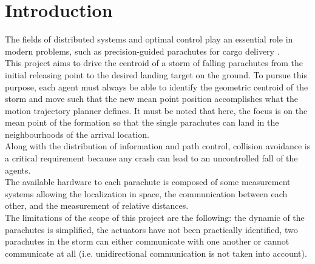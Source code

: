 \section{Introduction}
The fields of distributed systems and optimal control play an essential role in modern problems, such as precision-guided parachutes for cargo delivery \cite{b2} \cite{b3}.\\
This project aims to drive the centroid of a storm of falling parachutes from the initial releasing point to the desired landing target on the ground. To pursue this purpose, each agent must always be able to identify the geometric centroid of the storm and move such that the new mean point position accomplishes what the motion trajectory planner defines. It must be noted that here, the focus is on the mean point of the formation so that the single parachutes can land in the neighbourhoods of the arrival location.\\
Along with the distribution of information and path control, collision avoidance is a critical requirement because any crash can lead to an uncontrolled fall of the agents.\\
The available hardware to each parachute is composed of some measurement systems allowing the localization in space, the communication between each other, and the measurement of relative distances.\\
The limitations of the scope of this project are the following: the dynamic of the parachutes is simplified, the actuators have not been practically identified, two parachutes in the storm can either communicate with one another or cannot communicate at all (i.e. unidirectional communication is not taken into account).